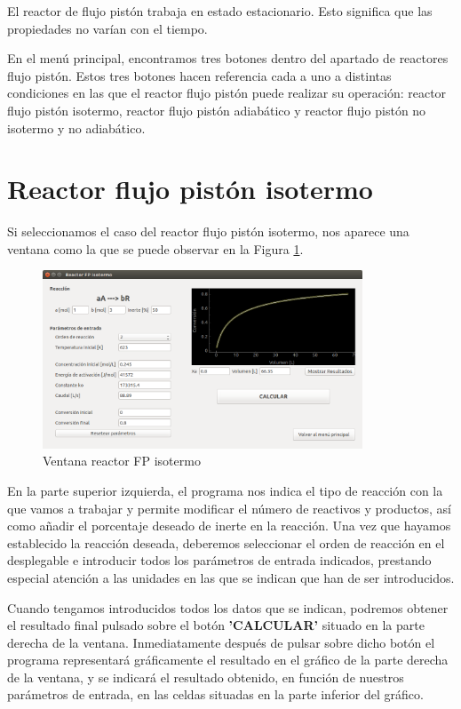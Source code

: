 	El reactor de flujo pistón trabaja en estado estacionario. Esto significa que las propiedades no varían con el tiempo.
	
	En el menú principal, encontramos tres botones dentro del apartado de reactores flujo pistón. Estos tres botones hacen referencia cada a uno a distintas condiciones en las que el reactor flujo pistón puede realizar su operación: reactor flujo pistón isotermo, reactor flujo pistón adiabático y reactor flujo pistón no isotermo y no adiabático.
	
\section{Reactor flujo pistón isotermo}
Si seleccionamos el caso del reactor flujo pistón isotermo, nos aparece una ventana como la que se puede observar en la Figura \ref{fig:ventana_isotermo}.

\begin{figure}[h!]
	\begin{center}
		\includegraphics[width=0.85\textwidth]{./imagenes/reactor_fp/isotermo1.png}\caption{Ventana reactor FP isotermo}\label{fig:ventana_isotermo}
	\end{center}
\end{figure}

En la parte superior izquierda, el programa nos indica el tipo de reacción con la que vamos a trabajar y permite modificar el número de reactivos y productos, así como añadir el porcentaje deseado de inerte en la reacción. Una vez que hayamos establecido la reacción deseada, deberemos seleccionar el orden de reacción en el desplegable e introducir todos los parámetros de entrada indicados, prestando especial atención a las unidades en las que se indican que han de ser introducidos.

Cuando tengamos introducidos todos los datos que se indican, podremos obtener el resultado final pulsado sobre el botón \textbf{'CALCULAR'} situado en la parte derecha de la ventana. Inmediatamente después de pulsar sobre dicho botón el programa representará gráficamente el resultado en el gráfico de la parte derecha de la ventana, y se indicará el resultado obtenido, en función de nuestros parámetros de entrada, en las celdas situadas en la parte inferior del gráfico.


